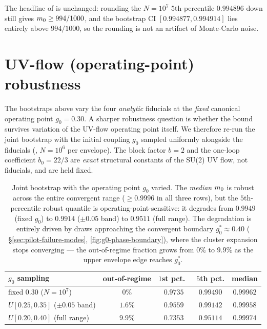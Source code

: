 The headline of  is unchanged: rounding the
$N = 10^7$ $5$th-percentile $0.994896$ down still gives
$m_0 \ge 994/1000$, and the bootstrap CI
$[0.994877, 0.994914]$ lies entirely above $994/1000$, so the
rounding is not an artifact of Monte-Carlo noise.

\section{UV-flow (operating-point) robustness}
\label{sec:appx-uvflow}

%

The bootstraps above vary the four \emph{analytic} fiducials at the
\emph{fixed} canonical operating point $g_0 = 0.30$.  A sharper
robustness question is whether the bound survives variation of the
UV-flow operating point itself.  We therefore re-run the joint
bootstrap with the initial coupling $g_0$ sampled uniformly alongside
the fiducials (,
$N = 10^6$ per envelope).  The block factor $b = 2$ and the one-loop
coefficient $b_0 = 22/3$ are \emph{exact} structural constants of the
SU(2) UV flow, not fiducials, and are held fixed.

\begin{table}[h]
\centering
\renewcommand{\arraystretch}{1.2}
\begin{tabular}{lcccc}
\toprule
$g_0$ sampling & out-of-regime & $1$st pct.\ & \textbf{$5$th pct.} & median \\
\midrule
fixed $0.30$ ($N=10^7$)          & $0\%$    & $0.9735$ & $\mathbf{0.99490}$ & $0.99962$ \\
$U[0.25, 0.35]$ ($\pm 0.05$ band) & $1.6\%$  & $0.9559$ & $\mathbf{0.99142}$ & $0.99958$ \\
$U[0.20, 0.40]$ (full range)      & $9.9\%$  & $0.7353$ & $\mathbf{0.95114}$ & $0.99974$ \\
\bottomrule
\end{tabular}
\caption{Joint bootstrap with the operating point $g_0$ varied.  The
\emph{median} $m_0$ is robust across the entire convergent range
($\ge 0.9996$ in all three rows), but the $5$th-percentile robust
quantile is operating-point-sensitive: it degrades from $0.9949$ (fixed
$g_0$) to $0.9914$ ($\pm 0.05$ band) to $0.9511$ (full range).  The
degradation is entirely driven by draws approaching the convergent
boundary $g_0^\ast \approx 0.40$ (
\S\ref{sec:pilot-failure-modes}, \cref{fig:g0-phase-boundary}), where
the cluster expansion stops converging --- the out-of-regime fraction
grows from $0\%$ to $9.9\%$ as the upper envelope edge reaches
$g_0^\ast$.}
\label{tab:appx-uvflow}
\end{table}

